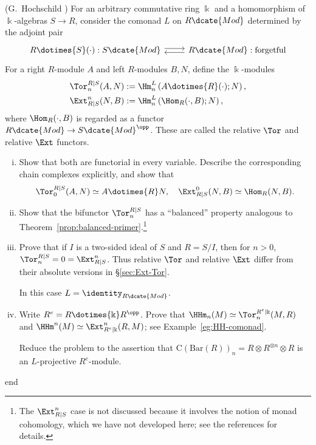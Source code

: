 	\item (G.\ Hochschild \cite{Ho56}) For an arbitrary commutative ring
	$\Bbbk$ and a homomorphism of $\Bbbk$-algebras $S\to R$, consider the
	comonad $L$ on $R\dcate{Mod}$ determined by the adjoint pair
	\[\begin{tikzcd}
		R \dotimes{S} (\cdot): S\dcate{Mod} \arrow[shift left, r] & R\dcate{Mod}: \text{forgetful} \arrow[shift left, l]
	\end{tikzcd}\]
	For a right $R$-module $A$ and left $R$-modules $B,N$, define the
	$\Bbbk$-modules
	\begin{align*}
		\Tor^{R|S}_n(A, N) & := \Hm^L_n\left( A \dotimes{R}(\cdot) ; N \right), \\
		\Ext_{R|S}^n(N, B) & := \Hm^L_n\left( \Hom_R(\cdot, B) ; N \right),
	\end{align*}
	where $\Hom_R(\mathord\cdot,B)$ is regarded as a functor
	$R\dcate{Mod}\to S\dcate{Mod}^{\opp}$. These are called the relative
	$\Tor$ and relative $\Ext$ functors.
	\begin{enumerate}[(i)]
		\item Show that both are functorial in every variable. Describe the
		corresponding chain complexes explicitly, and show that
		\[ \Tor^{R|S}_0(A, N) \simeq A \dotimes{R} N, \quad \Ext_{R|S}^0(N, B) \simeq \Hom_R(N, B). \]

		\item Show that the bifunctor $\Tor^{R|S}_n$ has a ``balanced''
		property analogous to Theorem~\ref{prop:balanced-primer}.\footnote{The
		$\Ext_{R|S}^n$ case is not discussed because it involves the notion of
		monad cohomology, which we have not developed here; see the references
		for details.}

		\item Prove that if $I$ is a two-sided ideal of $S$ and $R=S/I$, then
		for $n>0$, $\Tor_n^{R|S}=0=\Ext^n_{R|S}$. Thus relative $\Tor$ and
		relative $\Ext$ differ from their absolute versions in
		\S\ref{sec:Ext-Tor}.
		\begin{hint}
			In this case $L=\identity_{R\dcate{Mod}}$.
		\end{hint}

		\item Write $R^e=R\dotimes{\Bbbk}R^{\opp}$. Prove that
		$\HHm_n(M)\simeq\Tor^{R^e|\Bbbk}_n(M,R)$ and
		$\HHm^n(M)\simeq\Ext_{R^e|\Bbbk}^n(R,M)$; see
		Example~\ref{eg:HH-comonad}.
		\begin{hint}
			Reduce the problem to the assertion that
			$\mathrm{C}(\mathrm{Bar}(R))_n=R\otimes R^{\otimes n}\otimes R$
			is an $L$-projective $R^e$-module.
		\end{hint}
	\end{enumerate}
\csname end
